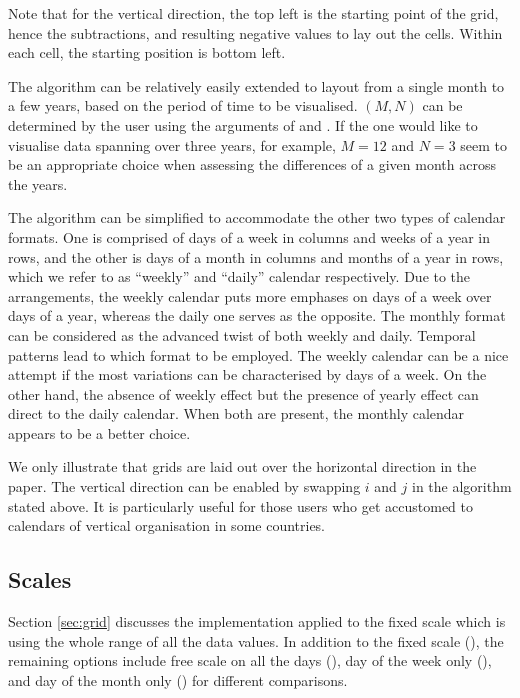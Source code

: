 \documentclass[article]{jss}
\begin{document}
Note that for the vertical direction, the top left is the starting point
of the grid, hence the subtractions, and resulting negative values to
lay out the cells. Within each cell, the starting position is bottom
left.

The algorithm can be relatively easily extended to layout from a single
month to a few years, based on the period of time to be visualised.
\((M, N)\) can be determined by the user using the arguments of
 and . If the one would like to visualise data
spanning over three years, for example, \(M = 12\) and \(N = 3\) seem to
be an appropriate choice when assessing the differences of a given month
across the years.

The algorithm can be simplified to accommodate the other two types of
calendar formats. One is comprised of days of a week in columns and
weeks of a year in rows, and the other is days of a month in columns and
months of a year in rows, which we refer to as ``weekly'' and ``daily''
calendar respectively. Due to the arrangements, the weekly calendar puts
more emphases on days of a week over days of a year, whereas the daily
one serves as the opposite. The monthly format can be considered as the
advanced twist of both weekly and daily. Temporal patterns lead to which
format to be employed. The weekly calendar can be a nice attempt if the
most variations can be characterised by days of a week. On the other
hand, the absence of weekly effect but the presence of yearly effect can
direct to the daily calendar. When both are present, the monthly
calendar appears to be a better choice.

We only illustrate that grids are laid out over the horizontal direction
in the paper. The vertical direction can be enabled by swapping \(i\)
and \(j\) in the algorithm stated above. It is particularly useful for
those users who get accustomed to calendars of vertical organisation in
some countries.

\subsection{Scales}\label{scales}

Section \ref{sec:grid} discusses the implementation applied to the fixed
scale which is using the whole range of all the data values. In addition
to the fixed scale (), the remaining options include free
scale on all the days (), day of the week only
(), and day of the month only () for
different comparisons.
\end{document}
